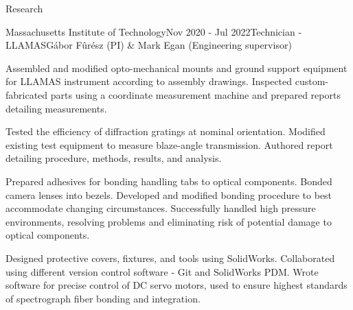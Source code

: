 \documentclass{resume} %
\begin{document}
\begin{rSection}{Research}

\begin{rSubsection}{Massachusetts Institute of Technology}{Nov 2020 - Jul 2022}{Technician - LLAMAS}{G\'abor F\^ur\'esz (PI) \& Mark Egan (Engineering supervisor)}
\item Assembled and modified opto-mechanical mounts and ground support equipment for LLAMAS instrument according to assembly drawings. Inspected custom-fabricated parts using a coordinate measurement machine and prepared reports detailing measurements.
\item Tested the efficiency of diffraction gratings at nominal orientation. Modified existing test equipment to measure blaze-angle transmission. Authored report detailing procedure, methods, results, and analysis.
\item Prepared  adhesives for bonding handling tabs to optical components. Bonded camera lenses into bezels. Developed and modified bonding procedure to best accommodate changing circumstances. Successfully handled high pressure environments, resolving problems and eliminating risk of potential damage to optical components.
\item Designed protective covers, fixtures, and tools using SolidWorks. Collaborated using different version control software - Git and SolidWorks PDM. Wrote software for precise control of DC servo motors, used to ensure highest standards of spectrograph fiber bonding and integration.
\end{rSubsection}


\end{rSection}
\end{document}
